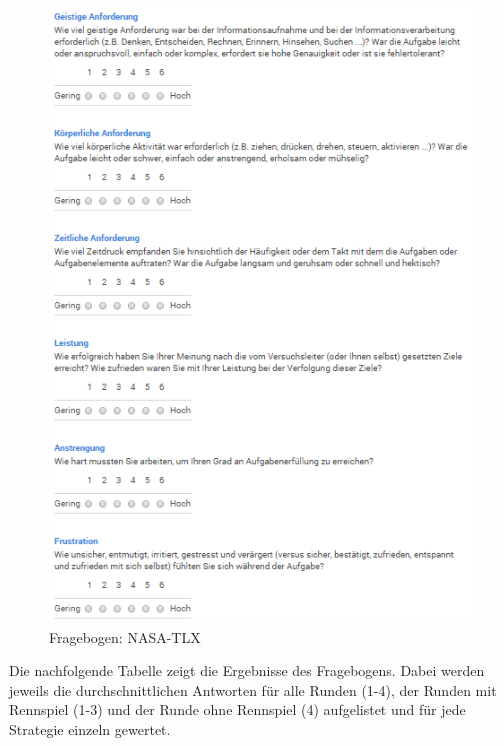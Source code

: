 \documentclass[12pt,a4paper]{scrartcl}
\begin{document}
\begin{figure}[H]
\begin{center}
\includegraphics[width=12cm]{nasa.png}
\caption{Fragebogen: NASA-TLX}
\label{fbnasatlx1}
\end{center}
\end{figure}

Die nachfolgende Tabelle zeigt die Ergebnisse des Fragebogens. Dabei werden jeweils die durchschnittlichen Antworten für alle Runden (1-4), der Runden mit Rennspiel (1-3) und der Runde ohne Rennspiel (4) aufgelistet und für jede Strategie einzeln gewertet. \newpage
\end{document}
